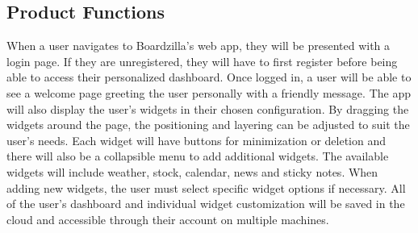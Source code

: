 \documentclass[]{article}
\begin{document}

\subsection{Product Functions}
\label{sub:product_functions}
When a user navigates to Boardzilla's web app, they will be presented with a login page. If they are unregistered, they will have to first register before being able to access their personalized dashboard. Once logged in, a user will be able to see a welcome page greeting the user personally with a friendly message. The app will also display the user's widgets in their chosen configuration. By dragging the widgets around the page, the positioning and layering can be adjusted to suit the user's needs. Each widget will have buttons for minimization or deletion and there will also be a collapsible menu to add additional widgets. The available widgets will include weather, stock, calendar, news and sticky notes. When adding new widgets, the user must select specific widget options if necessary. All of the user's dashboard and individual widget customization will be saved in the cloud and accessible through their account on multiple machines.
\end{document}
